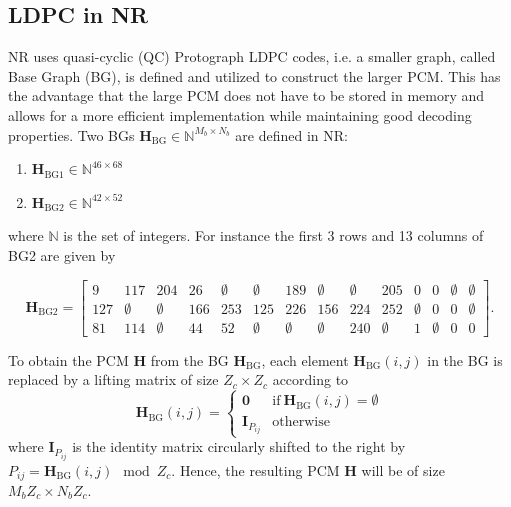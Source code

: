 \documentclass{article}
\def\0{\mathbf{0}}
\def\H{\mathbf{H}}
\def\Hbg{\mathbf{H}_\mathrm{BG}}
\def\Hbgo{\mathbf{H}_\mathrm{BG1}}
\def\Hbgt{\mathbf{H}_\mathrm{BG2}}
\def\I{\mathbf{I}}
\def\Mb{{M_b}}
\def\Nb{{N_b}}
\def\Nbb{\mathbb{N}}
\def\Zc{{Z_c}}
\begin{document}
\subsection{LDPC in NR}
\label{sec:ldpc-nr}

NR uses quasi-cyclic (QC) Protograph LDPC codes, i.e. a smaller graph, called Base Graph (BG), is defined and utilized to construct the larger PCM. This has the advantage that the large PCM does not have to be stored in memory and allows for a more efficient implementation while maintaining good decoding properties.
Two BGs $\Hbg\in\Nbb^{\Mb\times \Nb}$ are defined in NR:
\begin{enumerate}
\item $\Hbgo\in\Nbb^{46\times 68}$
\item $\Hbgt\in\Nbb^{42\times 52}$
\end{enumerate}
where $\Nbb$ is the set of integers. For instance the first 3 rows and 13 columns of BG2 are given by

\setcounter{MaxMatrixCols}{30}
\begin{equation*}
  \label{eq:33}
  \Hbgt =
  \begin{bmatrix}
    9   & 117       & 204       & 26  & \emptyset & \emptyset & 189       & \emptyset & \emptyset & 205       & 0         & 0         & \emptyset & \emptyset \\
    127 & \emptyset & \emptyset & 166 & 253       & 125       & 226       & 156       & 224       & 252       & \emptyset & 0         & 0         & \emptyset \\
    81  & 114       & \emptyset & 44  & 52        & \emptyset & \emptyset & \emptyset & 240       & \emptyset & 1         & \emptyset & 0         & 0
  \end{bmatrix}.
\end{equation*}

To obtain the PCM $\H$ from the BG $\Hbg$, each element $\Hbg(i,j)$ in the BG is replaced by a lifting matrix of size $\Zc\times \Zc$ according to
\begin{equation}
  \label{eq:35}
  \Hbg(i,j) =
  \begin{cases}
    \0 & \textrm{if}~ \Hbg(i,j)=\emptyset \\
    \I_{P_{ij}} & \textrm{otherwise}
  \end{cases}
\end{equation}
where $\I_{P_{ij}}$ is the identity matrix circularly shifted to the right by $P_{ij} = \Hbg(i,j)\mod \Zc$. Hence, the resulting PCM $\H$ will be of size $\Mb\Zc\times\Nb\Zc$.
\end{document}
